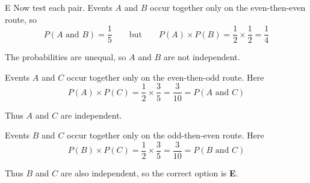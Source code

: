 \documentclass[11pt,a4paper]{article}
\begin{document}
\begin{enumerate}[label=\textbf{\arabic*.},leftmargin=*,itemsep=0pt,start=14]
\begin{djsSolution}{E}
Now test each pair. Events $A$ and $B$ occur together only on the even-then-even route, so
\[
P(A\text{ and }B)=\frac15
\qquad\text{but}\qquad
P(A)\times P(B)=\frac12\times\frac12=\frac14
\]

The probabilities are unequal, so $A$ and $B$ are not independent.

Events $A$ and $C$ occur together only on the even-then-odd route. Here
\[
P(A)\times P(C)=\frac12\times\frac35=\frac3{10}=P(A\text{ and }C)
\]

Thus $A$ and $C$ are independent.

Events $B$ and $C$ occur together only on the odd-then-even route. Here
\[
P(B)\times P(C)=\frac12\times\frac35=\frac3{10}=P(B\text{ and }C)
\]

Thus $B$ and $C$ are also independent, so the correct option is \textbf{E}.
\end{djsSolution}
\end{enumerate}
\clearpage
\thispagestyle{djssolutions}
\vspace*{8pt}
\end{document}
